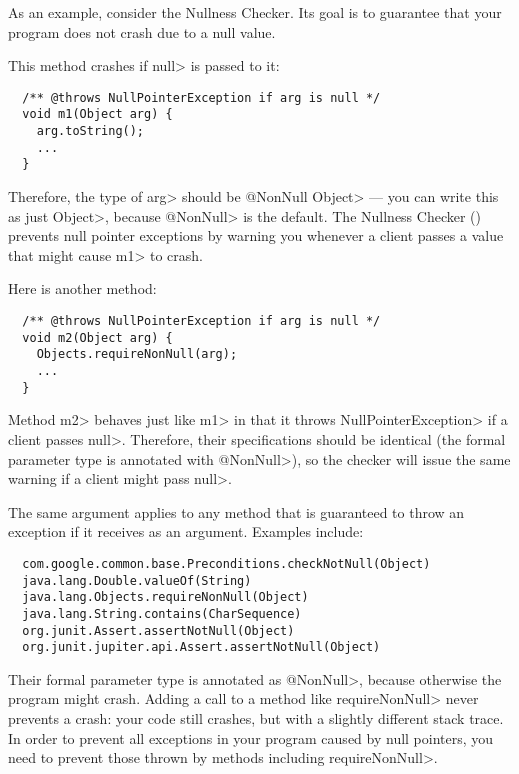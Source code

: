 
As an example, consider the Nullness Checker.  Its goal is to guarantee that your
program does not crash due to a null value.

This method crashes if \<null> is passed to it:

\begin{Verbatim}
  /** @throws NullPointerException if arg is null */
  void m1(Object arg) {
    arg.toString();
    ...
  }
\end{Verbatim}

\noindent
Therefore, the type of \<arg>
should be \<@NonNull Object> --- you can write this as just \<Object>, because
\<@NonNull> is the default.  The Nullness Checker ()
prevents null pointer exceptions by warning you whenever a client passes a
value that might cause \<m1> to crash.

Here is another method:

\begin{Verbatim}
  /** @throws NullPointerException if arg is null */
  void m2(Object arg) {
    Objects.requireNonNull(arg);
    ...
  }
\end{Verbatim}

Method \<m2> behaves just like \<m1> in that it throws
\<NullPointerException> if a client passes \<null>.  Therefore, their
specifications should be identical (the formal parameter type is annotated
with \<@NonNull>), so the
checker will issue the same warning if a client might pass \<null>.

The same argument applies to any method that is guaranteed to throw an exception
if it receives  as an argument.  Examples include:

\begin{Verbatim}
  com.google.common.base.Preconditions.checkNotNull(Object)
  java.lang.Double.valueOf(String)
  java.lang.Objects.requireNonNull(Object)
  java.lang.String.contains(CharSequence)
  org.junit.Assert.assertNotNull(Object)
  org.junit.jupiter.api.Assert.assertNotNull(Object)
\end{Verbatim}

Their formal parameter type is annotated as \<@NonNull>, because otherwise the
program might crash.  Adding a call to a method like \<requireNonNull>
never prevents a crash:  your code still crashes, but with a slightly
different stack trace.  In order to prevent all exceptions in your program
caused by null pointers, you need to prevent those thrown by methods including
\<requireNonNull>.

